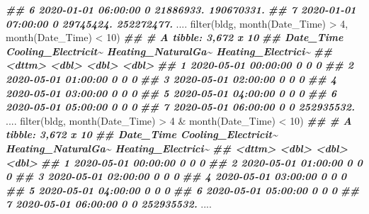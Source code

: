 \documentclass[
]{book}
\newenvironment{Shaded}{\begin{snugshade}}{\end{snugshade}}
\newcommand{\DecValTok}[1]{\textcolor[rgb]{0.00,0.00,0.81}{#1}}
\newcommand{\DocumentationTok}[1]{\textcolor[rgb]{0.56,0.35,0.01}{\textbf{\textit{#1}}}}
\newcommand{\FunctionTok}[1]{\textcolor[rgb]{0.00,0.00,0.00}{#1}}
\newcommand{\NormalTok}[1]{#1}
\newcommand{\SpecialCharTok}[1]{\textcolor[rgb]{0.00,0.00,0.00}{#1}}
\begin{document}
\begin{Shaded}
\begin{Highlighting}[]
\DocumentationTok{\#\#  6 2020{-}01{-}01 06:00:00                   0          21886933.         190670331.}
\DocumentationTok{\#\#  7 2020{-}01{-}01 07:00:00                   0          29745424.         252272477.}
\NormalTok{....}
\FunctionTok{filter}\NormalTok{(bldg, }\FunctionTok{month}\NormalTok{(Date\_Time) }\SpecialCharTok{\textgreater{}} \DecValTok{4}\NormalTok{, }\FunctionTok{month}\NormalTok{(Date\_Time) }\SpecialCharTok{\textless{}} \DecValTok{10}\NormalTok{)}
\DocumentationTok{\#\# \# A tibble: 3,672 x 10}
\DocumentationTok{\#\#    Date\_Time           Cooling\_Electricit\textasciitilde{} Heating\_NaturalGa\textasciitilde{} Heating\_Electrici\textasciitilde{}}
\DocumentationTok{\#\#    \textless{}dttm\textgreater{}                            \textless{}dbl\textgreater{}              \textless{}dbl\textgreater{}              \textless{}dbl\textgreater{}}
\DocumentationTok{\#\#  1 2020{-}05{-}01 00:00:00                  0                   0                 0 }
\DocumentationTok{\#\#  2 2020{-}05{-}01 01:00:00                  0                   0                 0 }
\DocumentationTok{\#\#  3 2020{-}05{-}01 02:00:00                  0                   0                 0 }
\DocumentationTok{\#\#  4 2020{-}05{-}01 03:00:00                  0                   0                 0 }
\DocumentationTok{\#\#  5 2020{-}05{-}01 04:00:00                  0                   0                 0 }
\DocumentationTok{\#\#  6 2020{-}05{-}01 05:00:00                  0                   0                 0 }
\DocumentationTok{\#\#  7 2020{-}05{-}01 06:00:00                  0                   0         252935532.}
\NormalTok{....}
\FunctionTok{filter}\NormalTok{(bldg, }\FunctionTok{month}\NormalTok{(Date\_Time) }\SpecialCharTok{\textgreater{}} \DecValTok{4} \SpecialCharTok{\&} \FunctionTok{month}\NormalTok{(Date\_Time) }\SpecialCharTok{\textless{}} \DecValTok{10}\NormalTok{)}
\DocumentationTok{\#\# \# A tibble: 3,672 x 10}
\DocumentationTok{\#\#    Date\_Time           Cooling\_Electricit\textasciitilde{} Heating\_NaturalGa\textasciitilde{} Heating\_Electrici\textasciitilde{}}
\DocumentationTok{\#\#    \textless{}dttm\textgreater{}                            \textless{}dbl\textgreater{}              \textless{}dbl\textgreater{}              \textless{}dbl\textgreater{}}
\DocumentationTok{\#\#  1 2020{-}05{-}01 00:00:00                  0                   0                 0 }
\DocumentationTok{\#\#  2 2020{-}05{-}01 01:00:00                  0                   0                 0 }
\DocumentationTok{\#\#  3 2020{-}05{-}01 02:00:00                  0                   0                 0 }
\DocumentationTok{\#\#  4 2020{-}05{-}01 03:00:00                  0                   0                 0 }
\DocumentationTok{\#\#  5 2020{-}05{-}01 04:00:00                  0                   0                 0 }
\DocumentationTok{\#\#  6 2020{-}05{-}01 05:00:00                  0                   0                 0 }
\DocumentationTok{\#\#  7 2020{-}05{-}01 06:00:00                  0                   0         252935532.}
\NormalTok{....}
\end{Highlighting}
\end{Shaded}
\end{document}

